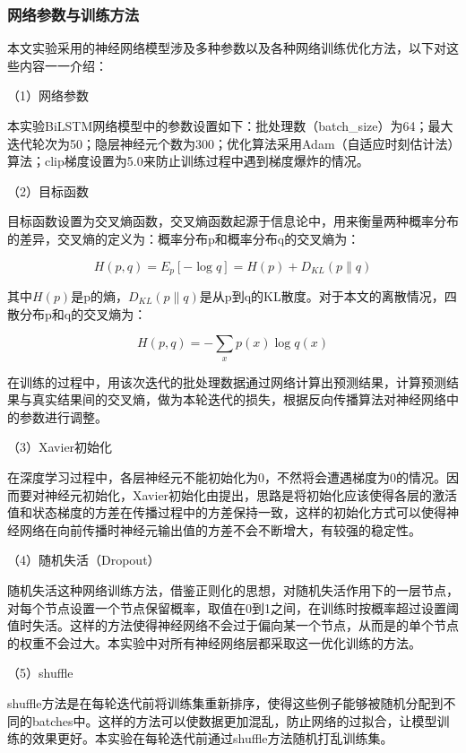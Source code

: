 \documentclass[winfonts,master,oneside,nobackinfo]{njuthesis}
\begin{document}
\subsubsection{网络参数与训练方法}

本文实验采用的神经网络模型涉及多种参数以及各种网络训练优化方法，以下对这些内容一一介绍：

（1）网络参数

本实验BiLSTM网络模型中的参数设置如下：批处理数（batch\_size）为64；最大迭代轮次为50；隐层神经元个数为300；优化算法采用Adam\cite{Adam}（自适应时刻估计法）算法；clip梯度设置为5.0来防止训练过程中遇到梯度爆炸的情况。

（2）目标函数

目标函数设置为交叉熵函数，交叉熵函数起源于信息论中，用来衡量两种概率分布的差异，交叉熵的定义为：概率分布p和概率分布q的交叉熵为：

\begin{equation}
H(p, q)=E_{p}[-\log q]=H(p)+D_{K L}(p \| q)
\end{equation}

其中$H(p)$是p的熵，$D_{K L}(p \| q)$是从p到q的KL散度。对于本文的离散情况，四散分布p和q的交叉熵为：

\begin{equation}
H(p, q)=-\sum_{x} p(x) \log q(x)
\end{equation}

在训练的过程中，用该次迭代的批处理数据通过网络计算出预测结果，计算预测结果与真实结果间的交叉熵，做为本轮迭代的损失，根据反向传播算法对神经网络中的参数进行调整。

（3）Xavier初始化

在深度学习过程中，各层神经元不能初始化为0，不然将会遭遇梯度为0的情况。因而要对神经元初始化，Xavier初始化由\cite{Glorot}提出，思路是将初始化应该使得各层的激活值和状态梯度的方差在传播过程中的方差保持一致，这样的初始化方式可以使得神经网络在向前传播时神经元输出值的方差不会不断增大，有较强的稳定性。

（4）随机失活（Dropout）

随机失活这种网络训练方法，借鉴正则化的思想，对随机失活作用下的一层节点，对每个节点设置一个节点保留概率，取值在0到1之间，在训练时按概率超过设置阈值时失活。这样的方法使得神经网络不会过于偏向某一个节点，从而是的单个节点的权重不会过大。本实验中对所有神经网络层都采取这一优化训练的方法。

（5）shuffle

shuffle方法是在每轮迭代前将训练集重新排序，使得这些例子能够被随机分配到不同的batches中。这样的方法可以使数据更加混乱，防止网络的过拟合，让模型训练的效果更好。本实验在每轮迭代前通过shuffle方法随机打乱训练集。
\end{document}
